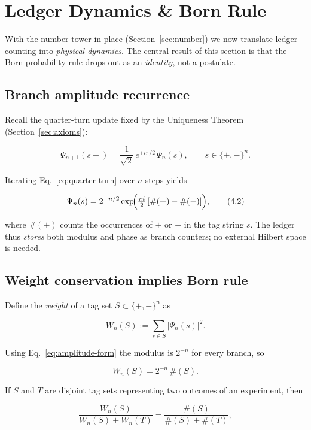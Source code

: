 \section{Ledger Dynamics \& Born Rule}
\label{sec:born}

With the number tower in place (Section~\ref{sec:number}) we now translate
ledger counting into \emph{physical dynamics}.  The central result of this
section is that the Born probability rule drops out as an \emph{identity},
not a postulate.

\subsection{Branch amplitude recurrence}

Recall the quarter-turn update fixed by the Uniqueness Theorem
(Section~\ref{sec:axioms}):

\[
  \Psi_{n+1}(s\pm)=\frac{1}{\sqrt2}\,
  e^{\pm i\pi/2}\,\Psi_n(s), \qquad
  s\in\{+,-\}^{n}.
\tag{4.1}\label{eq:quarter-turn}
\]

Iterating Eq.~\eqref{eq:quarter-turn} over $n$ steps yields

\[
  \Psi_n(s)=2^{-n/2}\exp\!\Bigl(
    \tfrac{\pi i}{2}\,[\#(+)-\#(-)]
  \Bigr),
\tag{4.2}\label{eq:amplitude-form}
\]

where $\#(\pm)$ counts the occurrences of $+$ or $-$ in the tag string
$s$.  The ledger thus \emph{stores} both modulus and phase as branch
counters; no external Hilbert space is needed.

\subsection{Weight conservation implies Born rule}

Define the \emph{weight} of a tag set $S\subset\{+,-\}^n$ as

\[
  W_n(S):=\sum_{s\in S} \lvert\Psi_n(s)\rvert^{2}.
\]

Using Eq.~\eqref{eq:amplitude-form} the modulus is $2^{-n}$ for every
branch, so

\[
  W_n(S)=2^{-n}\,\#(S).
\tag{4.3}\label{eq:weight-count}
\]

If $S$ and $T$ are disjoint tag sets representing two outcomes of an
experiment, then

\[
  \frac{W_n(S)}{W_n(S)+W_n(T)}
  =\frac{\#(S)}{\#(S)+\#(T)},
\tag{4.4}\label{eq:born}
\]

